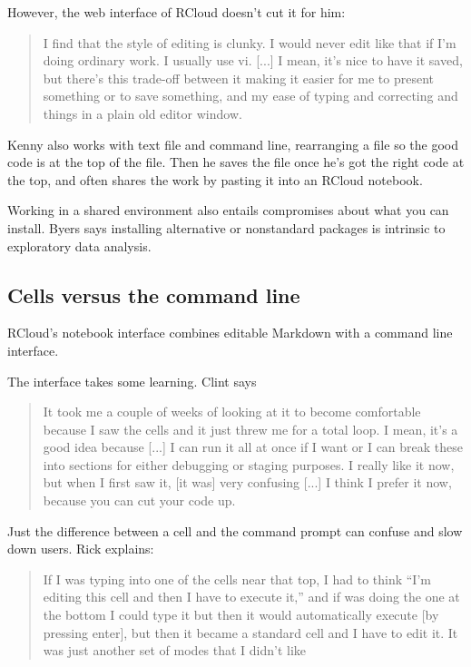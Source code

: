 However, the web interface of RCloud doesn't cut it for him:
\begin{quote}
I find that the style of editing is clunky. I would never edit like that if
I'm doing ordinary work. I usually use vi. [...] I mean, it's nice to have
it saved, but there's this trade-off between it making it easier for me to
present something or to save something, and my ease of typing and
correcting and things in a plain old editor window.
\end{quote}

Kenny also works with text file and command line, rearranging a file so the
good code is at the top of the file. Then he saves the file once he's got
the right code at the top, and often shares the work by pasting it into an
RCloud notebook.


Working in a shared environment also entails compromises about what you can
install. Byers says installing alternative or nonstandard packages is
intrinsic to exploratory data analysis.

\subsection{Cells versus the command line}
RCloud's notebook interface combines editable Markdown with a command line
interface.

The interface takes some learning. Clint says
\begin{quote}
It took me a couple of weeks of
looking at it to become comfortable because I saw the cells and it just threw me
for a total loop. I mean, it's a good idea because [...] I can run it all at
once if I want or I can break these into sections for either debugging or
staging purposes. I really like it now, but when I first saw it, [it was] very
confusing [...] I think I prefer it now, because you can cut your code up.
\end{quote}

Just the difference between a cell and the command prompt can confuse and slow
down users. Rick explains:
\begin{quote}
If I was typing into one of the cells near that top, I had
to think ``I'm editing this cell and then I have to execute it,'' and if was doing
the one at the bottom I could type it but then it would automatically execute
[by pressing enter], but then it became a standard cell and I have to edit
it. It was just another set of modes that I didn't like
\end{quote}

